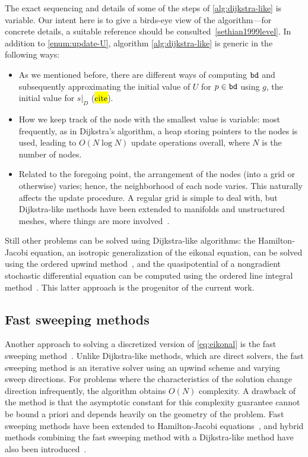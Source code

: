 \documentclass[eikonal.tex]{subfiles}
\begin{document}
The exact sequencing and details of some of the steps of
\cref{alg:dijkstra-like} is variable. Our intent here is to give a
birds-eye view of the algorithm---for concrete details, a suitable
reference should be consulted~\cref{sethian1999level}. In addition to
\cref{enum:update-U}, algorithm \cref{alg:dijkstra-like} is generic in
the following ways:
\begin{itemize}
\item As we mentioned before, there are different ways of computing
  $\texttt{bd}$ and subsequently approximating the initial value of $U$
  for $p \in \texttt{bd}$ using $g$, the initial value for
  $\left. s \right|_D$ (\hl{cite}).
\item How we keep track of the node with the smallest value is
  variable: most frequently, as in Dijkstra's algorithm, a heap
  storing pointers to the nodes is used, leading to $O(N \log N)$
  update operations overall, where $N$ is the number of nodes.
\item Related to the foregoing point, the arrangement of the nodes
  (into a grid or otherwise) varies; hence, the neighborhood of each
  node varies. This naturally affects the update procedure. A regular
  grid is simple to deal with, but Dijkstra-like methods have been
  extended to manifolds and unstructured meshes, where things are more
  involved~\cite{kimmel1998computing,sethian2000fast,bronstein2008numerical}.
\end{itemize}
Still other problems can be solved using Dijkstra-like algorithms: the
Hamilton-Jacobi equation, an isotropic generalization of the eikonal
equation, can be solved using the ordered upwind
method~\cite{sethian2003ordered}, and the quasipotential of a
nongradient stochastic differential equation can be computed using the
ordered line integral method~\cite{dahiya2017ordered}. This latter
approach is the progenitor of the current work.

\subsection{Fast sweeping methods} Another approach to solving a
discretized version of \cref{eq:eikonal} is the fast sweeping
method~\cite{tsai2003fast,zhao2005fast}. Unlike Dijkstra-like methods,
which are direct solvers, the fast sweeping method is an iterative
solver using an upwind scheme and varying sweep directions. For
problems where the characteristics of the solution change direction
infrequently, the algorithm obtains $O(N)$ complexity. A drawback of
the method is that the asymptotic constant for this complexity
guarantee cannot be bound a priori and depends heavily on the geometry
of the problem. Fast sweeping methods have been extended to
Hamilton-Jacobi equations~\cite{kao2004lax,tsai2003fast}, and hybrid
methods combining the fast sweeping method with a Dijkstra-like method
have also been introduced~\cite{chacon2012fast,chacon2015parallel}.
\end{document}
